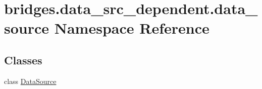 \hypertarget{namespacebridges_1_1data__src__dependent_1_1data__source}{}\section{bridges.\+data\+\_\+src\+\_\+dependent.\+data\+\_\+source Namespace Reference}
\label{namespacebridges_1_1data__src__dependent_1_1data__source}
\subsection*{Classes}
\begin{DoxyCompactItemize}
\item 
class \hyperlink{classbridges_1_1data__src__dependent_1_1data__source_1_1_data_source}{Data\+Source}
\end{DoxyCompactItemize}
